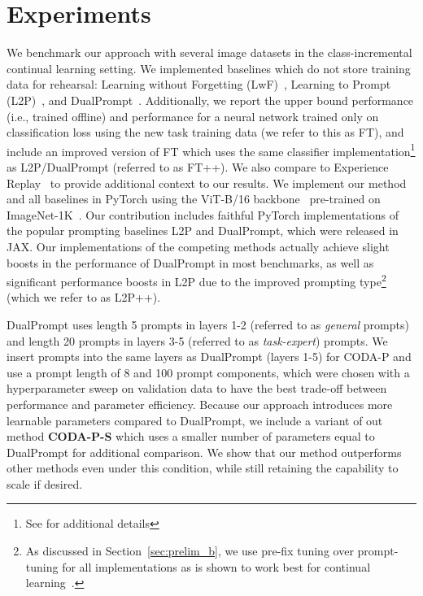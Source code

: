 \section{Experiments}
\label{sec:exp}





We benchmark our approach with several image datasets in the class-incremental continual learning setting. We implemented baselines which do not store training data for rehearsal: Learning without Forgetting (LwF)~\cite{li2016learning}, Learning to Prompt (L2P)~\cite{wang2022learning}, and DualPrompt~\cite{wang2022dualprompt}. Additionally, we report the upper bound performance (i.e., trained offline) and performance for a neural network trained only on classification loss using the new task training data (we refer to this as FT), and include an improved version of FT which uses the same classifier implementation\footnote{See \SMa{} for additional details} as L2P/DualPrompt (referred to as FT++). We also compare to Experience Replay~\cite{chaudhry2019tiny} to provide additional context to our results. We implement our method and all baselines in PyTorch\cite{paszke2019pytorch} using the ViT-B/16 backbone~\cite{dosovitskiy2020image} pre-trained on ImageNet-1K~\cite{russakovsky2015imagenet}. Our contribution includes faithful PyTorch implementations of the popular prompting baselines L2P and DualPrompt, which were released in JAX\cite{wang2022dualprompt,wang2022learning}. Our implementations of the competing methods actually achieve slight boosts in the performance of DualPrompt in most benchmarks, as well as significant performance boosts in L2P due to the improved prompting type\footnote{As discussed in Section~\ref{sec:prelim_b}, we use pre-fix tuning over prompt-tuning for all implementations as is shown to work best for continual learning~\cite{wang2022dualprompt}.} (which we refer to as L2P++). 


DualPrompt uses length 5 prompts in layers 1-2 (referred to as \emph{general} prompts) and length 20 prompts in layers 3-5 (referred to as \emph{task-expert}) prompts.  We insert prompts into the same layers as DualPrompt (layers 1-5) for CODA-P 
and use a prompt length of 8 and 100 prompt components, which were chosen with a hyperparameter sweep on validation data to have the best trade-off between performance and parameter efficiency. Because our approach introduces more learnable parameters compared to DualPrompt, we include a variant of out method \textbf{CODA-P-S} which uses a smaller number of parameters equal to DualPrompt for additional comparison. We show that our method outperforms other methods even under this condition, while still retaining the capability to scale if desired.

